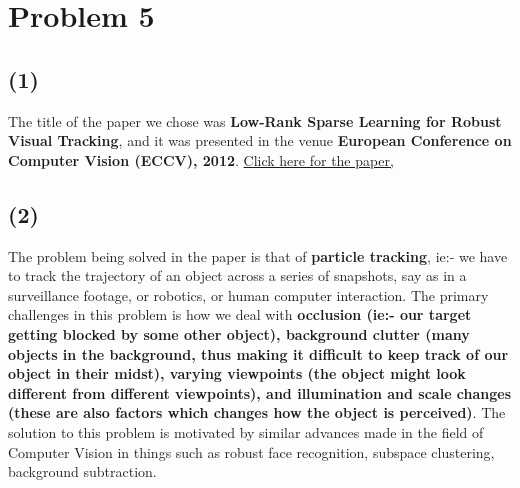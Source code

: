 \documentclass[a4paper,14pt]{article}
\numberwithin{definition}{section}
\numberwithin{mytheorem}{subsection}
\begin{document}
\section{Problem 5}
\subsection{(1)}
The title of the paper we chose was \textbf{Low-Rank Sparse Learning
for Robust Visual Tracking}, and it was presented in the venue \textbf{European Conference on Computer Vision (ECCV), 2012}. \href{https://citeseerx.ist.psu.edu/viewdoc/download?doi=10.1.1.390.1798&rep=rep1&type=pdf}{Click here for the paper,}
\subsection{(2)}
The problem being solved in the paper is that of \textbf{particle tracking}, ie:- we have to track the trajectory of an object across a series of snapshots, say as in a surveillance footage, or robotics, or human computer interaction. The primary challenges in this problem is how we deal with \textbf{occlusion (ie:- our target getting blocked by some other object), background clutter (many objects in the background, thus making it difficult to keep track of our object in their midst), varying viewpoints (the object might look different from different viewpoints), and illumination and scale changes (these are also factors which changes how the object is perceived)}. The solution to this problem is motivated by similar advances made in the field of Computer Vision in things such as robust face recognition, subspace clustering, background subtraction.
\end{document}
